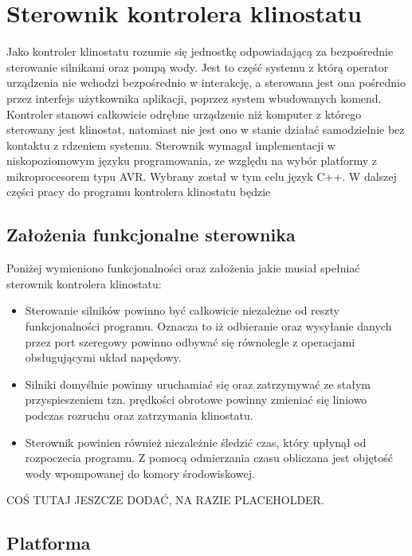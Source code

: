 \graphicspath{{./Sterownik/images}}

\chapter{Sterownik kontrolera klinostatu}

Jako kontroler klinostatu rozumie się jednostkę odpowiadającą za bezpośrednie sterowanie silnikami oraz pompą wody. Jest to część systemu z którą operator urządzenia nie wchodzi bezpośrednio w interakcję, a sterowana jest ona pośrednio przez interfejs użytkownika aplikacji, poprzez system wbudowanych komend. Kontroler stanowi całkowicie odrębne urządzenie niż komputer z którego sterowany jest klinostat, natomiast nie jest ono w stanie działać samodzielnie bez kontaktu z rdzeniem systemu. Sterownik wymagał implementacji w niskopoziomowym języku programowania, ze względu na wybór platformy z mikroprocesorem typu AVR. Wybrany został w tym celu język C++. W dalszej części pracy do programu kontrolera klinostatu będzie 
\section{Założenia funkcjonalne sterownika}

Poniżej wymieniono funkcjonalności oraz założenia jakie musiał spełniać sterownik kontrolera klinostatu:

\begin{itemize}
	
	\item Sterowanie silników powinno być całkowicie niezależne od reszty funkcjonalności programu. Oznacza to iż odbieranie oraz wysyłanie danych przez port szeregowy powinno odbywać się równolegle z operacjami obsługującymi układ napędowy.
	\item Silniki domyślnie powinny uruchamiać się oraz zatrzymywać ze stałym przyspieszeniem tzn. prędkości obrotowe powinny zmieniać się liniowo podczas rozruchu oraz zatrzymania klinostatu.
	\item Sterownik powinien również niezależnie śledzić czas, który upłynął od rozpoczecia programu. Z pomocą odmierzania czasu obliczana jest objętość wody wpompowanej do komory środowiskowej.

\end{itemize}

COŚ TUTAJ JESZCZE DODAĆ, NA RAZIE PLACEHOLDER.


\section{Platforma}

